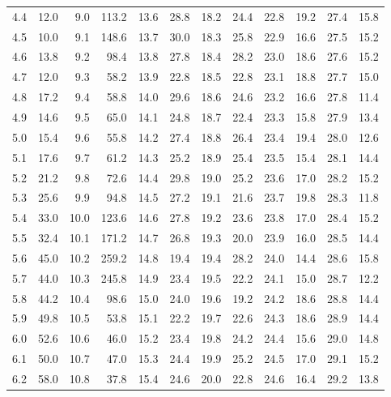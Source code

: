 \documentclass[UTF8]{ctexart}
\begin{document}
{\begin{longtable}{||r|r||r|r||r|r||r|r||r|r||r|r||}
		4.4   & 12.0  & 9.0   & 113.2  & 13.6  & 28.8  & 18.2  & 24.4  & 22.8  & 19.2  & 27.4  & 15.8  \\
		4.5   & 10.0  & 9.1   & 148.6  & 13.7  & 30.0  & 18.3  & 25.8  & 22.9  & 16.6  & 27.5  & 15.2  \\
		4.6   & 13.8  & 9.2   & 98.4  & 13.8  & 27.8  & 18.4  & 28.2  & 23.0  & 18.6  & 27.6  & 15.2  \\
		4.7   & 12.0  & 9.3   & 58.2  & 13.9  & 22.8  & 18.5  & 22.8  & 23.1  & 18.8  & 27.7  & 15.0  \\
		4.8   & 17.2  & 9.4   & 58.8  & 14.0  & 29.6  & 18.6  & 24.6  & 23.2  & 16.6  & 27.8  & 11.4  \\
		4.9   & 14.6  & 9.5   & 65.0  & 14.1  & 24.8  & 18.7  & 22.4  & 23.3  & 15.8  & 27.9  & 13.4  \\
		5.0   & 15.4  & 9.6   & 55.8  & 14.2  & 27.4  & 18.8  & 26.4  & 23.4  & 19.4  & 28.0  & 12.6  \\
		5.1   & 17.6  & 9.7   & 61.2  & 14.3  & 25.2  & 18.9  & 25.4  & 23.5  & 15.4  & 28.1  & 14.4  \\
		5.2   & 21.2  & 9.8   & 72.6  & 14.4  & 29.8  & 19.0  & 25.2  & 23.6  & 17.0  & 28.2  & 15.2  \\
		5.3   & 25.6  & 9.9   & 94.8  & 14.5  & 27.2  & 19.1  & 21.6  & 23.7  & 19.8  & 28.3  & 11.8  \\
		5.4   & 33.0  & 10.0  & 123.6  & 14.6  & 27.8  & 19.2  & 23.6  & 23.8  & 17.0  & 28.4  & 15.2  \\
		5.5   & 32.4  & 10.1  & 171.2  & 14.7  & 26.8  & 19.3  & 20.0  & 23.9  & 16.0  & 28.5  & 14.4  \\
		5.6   & 45.0  & 10.2  & 259.2  & 14.8  & 19.4  & 19.4  & 28.2  & 24.0  & 14.4  & 28.6  & 15.8  \\
		5.7   & 44.0  & 10.3  & 245.8  & 14.9  & 23.4  & 19.5  & 22.2  & 24.1  & 15.0  & 28.7  & 12.2  \\
		5.8   & 44.2  & 10.4  & 98.6  & 15.0  & 24.0  & 19.6  & 19.2  & 24.2  & 18.6  & 28.8  & 14.4  \\
		5.9   & 49.8  & 10.5  & 53.8  & 15.1  & 22.2  & 19.7  & 22.6  & 24.3  & 18.6  & 28.9  & 14.4  \\
		6.0   & 52.6  & 10.6  & 46.0  & 15.2  & 23.4  & 19.8  & 24.2  & 24.4  & 15.6  & 29.0  & 14.8  \\
		6.1   & 50.0  & 10.7  & 47.0  & 15.3  & 24.4  & 19.9  & 25.2  & 24.5  & 17.0  & 29.1  & 15.2  \\
		6.2   & 58.0  & 10.8  & 37.8  & 15.4  & 24.6  & 20.0  & 22.8  & 24.6  & 16.4  & 29.2  & 13.8  \\

\end{longtable}}
\end{document}
